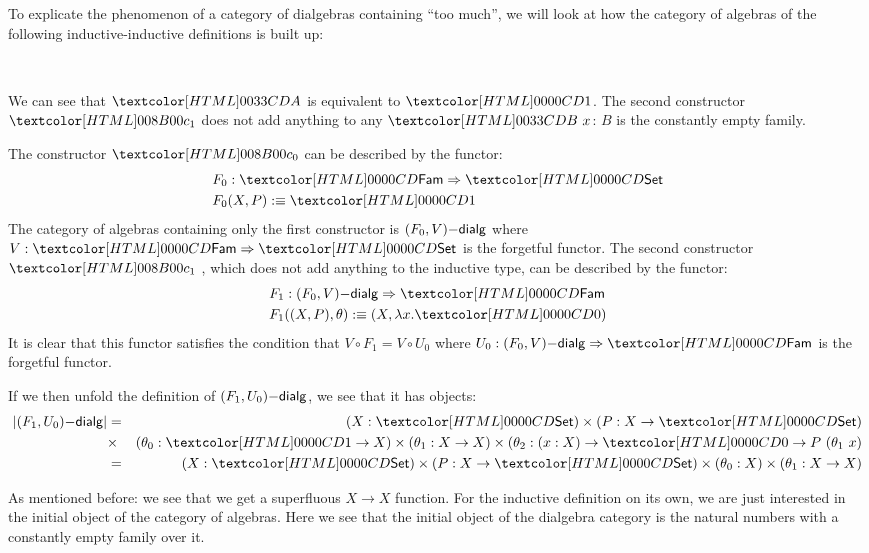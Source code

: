 \begin{remark}
  To explicate the phenomenon of a category of dialgebras containing
  ``too much'', we will look at how the category of algebras of the
  following inductive-inductive definitions is built up:
  \begin{sorts}
    \sortnamety{\Aty}{\Set} \\
    \sortnamety{\Bty}{\Aty \to \Set}
  \end{sorts}
  \begin{datatype}{\Aty}{}
    \constr{\Aco}{\Aty}
  \end{datatype}
  \begin{datatype}{\Bty}{}
  \end{datatype}
  We can see that $\Aty$ is equivalent to $\unitty$. The second
  constructor $\Bci$ does not add anything to any $\Bty\ x$: $B$ is
  the constantly empty family.

  The constructor $\Aco$ can be described by
  the functor:
  \begin{align*}
    &F_0 : \Func{\Fam}{\Set} \\
    &F_0 (X , P) \ddefeq \unitty
  \end{align*}
  The category of algebras containing only the first constructor is
  $(F_0,V)\mathsf{-dialg}$ where $V : \Func{\Fam}{\Set}$ is the forgetful
  functor. The second constructor $\Bci$ , which does not add anything
  to the inductive type, can be described by the functor:
  \begin{align*}
    &F_1 : \Func{\dialgcat{F_0}{V}}{\Fam} \\
    &F_1 ((X , P) , \theta) \ddefeq (X , \lambda x . \emptyty)
  \end{align*}
  It is clear that this functor satisfies the condition that
  $V \circ F_1 = V \circ U_0$ where
  $U_0 : \Func{\dialgcat{F_0}{V}}{\Fam}$ is the forgetful functor.

  If we then unfold the definition of $(F_1,U_0)\mathsf{-dialg}$, we see
  that it has objects:
  \begin{align*}
    | \dialgcat{F_1}{U_0} | &= &(X : \Set) \times (P : X \to \Set) \\
    &\times &(\theta_0 : \unitty \to X) \times (\theta_1 : X \to X) \times (\theta_2 :  (x : X) \to \emptyty \to P\ (\theta_1\ x) \\
    &= &(X : \Set) \times (P : X \to \Set) \times (\theta_0 : X) \times (\theta_1 : X \to X)
  \end{align*}
  
  As mentioned before: we see that we get a superfluous $X \to X$
  function. For the inductive definition on its own, we are just
  interested in the initial object of the category of algebras. Here
  we see that the initial object of the dialgebra category is the
  natural numbers with a constantly empty family over it.
\end{remark}


